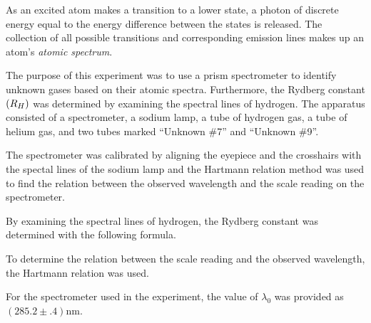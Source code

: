 \begin{paper}

As an excited atom makes a transition to a lower state, a photon of discrete energy equal to the energy difference between the states is released. The collection of all possible transitions and corresponding emission lines makes up an atom's \textit{atomic spectrum}.


The purpose of this experiment was to use a prism spectrometer to identify
unknown gases based on their atomic spectra. %
Furthermore, the Rydberg constant $\left( R_H\right)$ was determined by examining the
spectral lines of hydrogen.
The apparatus consisted of a spectrometer, a sodium lamp, a tube of hydrogen
gas, a tube of helium gas, and two tubes marked ``Unknown
\#7'' and ``Unknown \#9''.

The spectrometer was calibrated by aligning the eyepiece and the crosshairs with the spectal lines of the sodium lamp and the Hartmann relation method was used to find the
relation between the observed wavelength and the scale reading on the
spectrometer.

By examining the spectral lines of hydrogen, the Rydberg constant was
determined with the following formula.

\begin{paperwhere}
\end{paperwhere}

To determine the relation between the scale reading and the
observed wavelength, the Hartmann relation was used.\columnbreak

\begin{paperwhere}
\end{paperwhere}

For the spectrometer used in the experiment, the value of $\lambda_0$ was
provided as $(285.2\pm.4)\si{\nano\meter}$.


\end{paper}
